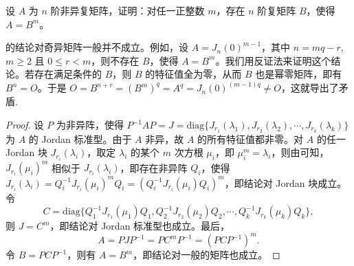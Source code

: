 \documentclass[../../main.tex]{subfiles}%
\begin{document}
\begin{theorem}[非异阵存在任意次的方根]\label{theorem:非奇异阵有任意方根}
设 $A$ 为 $n$ 阶非异复矩阵，证明：对任一正整数 $m$，存在 $n$ 阶复矩阵 $B$，使得 $A = B^m$。
\end{theorem}
\begin{remark}
的结论对奇异矩阵一般并不成立。例如，设 $A = J_n(0)^{m - 1}$，其中 $n = mq - r$, $m \geqslant  2$ 且 $0 \leqslant  r < m$，则不存在 $B$，使得 $A = B^m$。我们用反证法来证明这个结论。若存在满足条件的 $B$，则 $B$ 的特征值全为零，从而 $B$ 也是幂零矩阵，即有 $B^n = O$。于是 $O = B^{n + r} = (B^m)^q = A^q = J_n(0)^{(m - 1)q} \neq O$，这就导出了矛盾.
\end{remark}
\begin{proof}

设 $P$ 为非异阵，使得 $P^{-1}AP = J = \mathrm{diag}\{J_{r_1}(\lambda_1), J_{r_2}(\lambda_2), \cdots, J_{r_k}(\lambda_k)\}$ 为 $A$ 的 Jordan 标准型。由于 $A$ 非异，故 $A$ 的所有特征值都非零。对 $A$ 的任一 Jordan 块 $J_{r_i}(\lambda_i)$，取定 $\lambda_i$ 的某个 $m$ 次方根 $\mu_i$，即 $\mu_i^m = \lambda_i$，则由可知，$J_{r_i}(\mu_i)^m$ 相似于 $J_{r_i}(\lambda_i)$，即存在非异阵 $Q_i$，使得 $J_{r_i}(\lambda_i) = Q_i^{-1}J_{r_i}(\mu_i)^mQ_i = (Q_i^{-1}J_{r_i}(\mu_i)Q_i)^m$，即结论对 Jordan 块成立。令
\[C = \mathrm{diag}\{Q_1^{-1}J_{r_1}(\mu_1)Q_1, Q_2^{-1}J_{r_2}(\mu_2)Q_2, \cdots, Q_k^{-1}J_{r_k}(\mu_k)Q_k\},\]
则 $J = C^m$，即结论对 Jordan 标准型也成立。最后，
\[A = PJP^{-1} = PC^mP^{-1} = (PCP^{-1})^m.\]
令 $B = PCP^{-1}$，则有 $A = B^m$，即结论对一般的矩阵也成立。

\end{proof}
\end{document}
